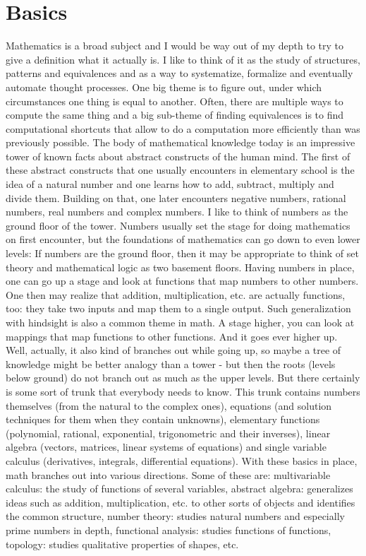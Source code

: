 \chapter{Basics}
Mathematics is a broad subject and I would be way out of my depth to try to give a definition what it actually is. I like to think of it as the study of structures, patterns and equivalences and as a way to systematize, formalize and eventually automate thought processes. One big theme is to figure out, under which circumstances one thing is equal to another. Often, there are multiple ways to compute the same thing and a big sub-theme of finding equivalences is to find computational shortcuts that allow to do a computation more efficiently than was previously possible. The body of mathematical knowledge today is an impressive tower of known facts about abstract constructs of the human mind. The first of these abstract constructs that one usually encounters in elementary school is the idea of a natural number and one learns how to add, subtract, multiply and divide them. Building on that, one later encounters negative numbers, rational numbers, real numbers and complex numbers. I like to think of numbers as the ground floor of the tower. Numbers usually set the stage for doing mathematics on first encounter, but the foundations of mathematics can go down to even lower levels: If numbers are the ground floor, then it may be appropriate to think of set theory and mathematical logic as two basement floors. Having numbers in place, one can go up a stage and look at functions that map numbers to other numbers. One then may realize that addition, multiplication, etc. are actually functions, too: they take two inputs and map them to a single output. Such generalization with hindsight is also a common theme in math. A stage higher, you can look at mappings that map functions to other functions. And it goes ever higher up. Well, actually, it also kind of branches out while going up, so maybe a tree of knowledge might be better analogy than a tower - but then the roots (levels below ground) do not branch out as much as the upper levels. But there certainly is some sort of trunk that everybody needs to know. This trunk contains numbers themselves (from the natural to the complex ones), equations (and solution techniques for them when they contain unknowns), elementary functions (polynomial, rational, exponential, trigonometric and their inverses), linear algebra (vectors, matrices, linear systems of equations) and single variable calculus (derivatives, integrals, differential equations). With these basics in place, math branches out into various directions. Some of these are: multivariable calculus: the study of functions of several variables, abstract algebra: generalizes ideas such as addition, multiplication, etc. to other sorts of objects and identifies the common structure, number theory: studies natural numbers and especially prime numbers in depth, functional analysis: studies functions of functions, topology: studies qualitative properties of shapes, etc. 

